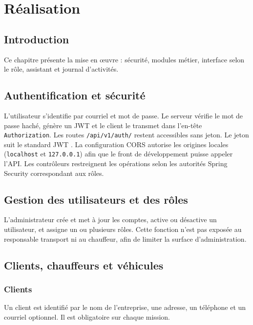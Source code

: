 \chapter{Réalisation}

\section{Introduction}

Ce chapitre présente la mise en œuvre : sécurité, modules métier, interface selon le rôle, assistant et journal d'activités.

\section{Authentification et sécurité}

L'utilisateur s'identifie par courriel et mot de passe. Le serveur vérifie le mot de passe haché, génère un JWT et le client le transmet dans l'en-tête \texttt{Authorization}. Les routes \texttt{/api/v1/auth/} restent accessibles sans jeton. Le jeton suit le standard JWT \cite{jwt}. La configuration CORS autorise les origines locales (\texttt{localhost} et \texttt{127.0.0.1}) afin que le front de développement puisse appeler l'API. Les contrôleurs restreignent les opérations selon les autorités Spring Security correspondant aux rôles.

\section{Gestion des utilisateurs et des rôles}

L'administrateur crée et met à jour les comptes, active ou désactive un utilisateur, et assigne un ou plusieurs rôles. Cette fonction n'est pas exposée au responsable transport ni au chauffeur, afin de limiter la surface d'administration.

\section{Clients, chauffeurs et véhicules}

\subsection{Clients}

Un client est identifié par le nom de l'entreprise, une adresse, un téléphone et un courriel optionnel. Il est obligatoire sur chaque mission.

